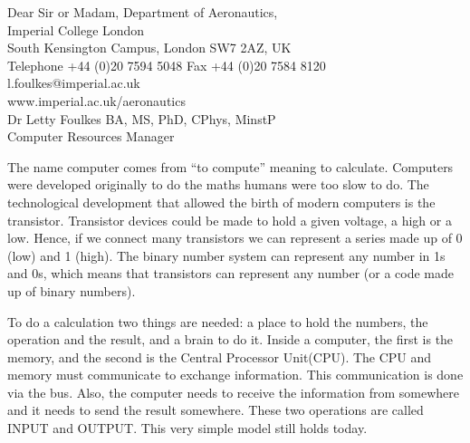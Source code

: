 \documentclass[logo]{impletter}
\begin{document}
{
Dear Sir or Madam,
}
{
Department of Aeronautics,\\
Imperial College London\\

South Kensington Campus, London SW7 2AZ, UK\\
Telephone +44 (0)20 7594 5048 Fax +44 (0)20 7584 8120\\

l.foulkes@imperial.ac.uk\\
www.imperial.ac.uk/aeronautics\\
}
{
Dr Letty Foulkes
}
{
BA, MS, PhD, CPhys, MinstP\\
}
{
Computer Resources Manager\\
}
\informal

The name computer comes from ``to compute'' meaning to
calculate. Computers were developed originally to do the maths humans
were too slow to do. The technological development that allowed the
birth of modern computers is the transistor. Transistor devices could
be made to hold a given voltage, a high or a low. Hence, if we connect
many transistors we can represent a series made up of 0 (low) and 1
(high). The binary number system can represent any number in 1s and
0s, which means that transistors can represent any number (or a code
made up of binary numbers).

To do a calculation two things are needed: a place to hold the
numbers, the operation and the result, and a brain to do it. Inside a
computer, the first is the memory, and the second is the Central
Processor Unit(CPU). The CPU and memory must communicate to exchange
information. This communication is done via the bus. Also, the
computer needs to receive the information from somewhere and it needs
to send the result somewhere. These two operations are called INPUT
and OUTPUT. This very simple model still holds today.
\end{document}

